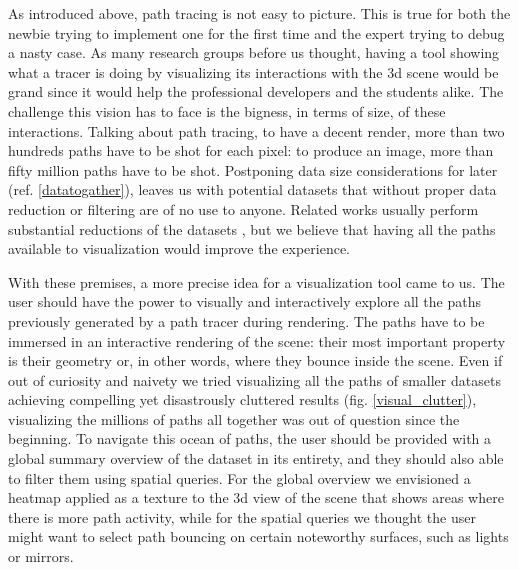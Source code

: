 As introduced above, path tracing is not easy to picture. This is true for both the newbie trying to implement one for the first time and the expert trying to debug a nasty case. As many research groups before us thought, having a tool showing what a tracer is doing by visualizing its interactions with the 3d scene would be grand since it would help the professional developers and the students alike. The challenge this vision has to face is the bigness, in terms of size, of these interactions. Talking about path tracing, to have a decent render, more than two hundreds paths have to be shot for each pixel: to produce an image, more than fifty million paths have to be shot. Postponing data size considerations for later (ref. \ref{datatogather}), leaves us with potential datasets that without proper data reduction or filtering are of no use to anyone. Related works usually perform substantial reductions of the datasets \cite{simons2019applying}\cite{EMCA@2019}, but we believe that having all the paths available to visualization would improve the experience.

With these premises, a more precise idea for a visualization tool came to us. 
The user should have the power to visually and interactively explore all the paths previously generated by a path tracer during rendering. The paths have to be immersed in an interactive rendering of the scene: their most important property is their geometry or, in other words, where they bounce inside the scene. Even if out of curiosity and naivety we tried visualizing all the paths of smaller datasets achieving compelling yet disastrously cluttered results (fig. \ref{visual_clutter}), visualizing the millions of paths all together was out of question since the beginning. To navigate this ocean of paths, the user should be provided with a global summary overview of the dataset in its entirety, and they should also able to filter them using spatial queries. For the global overview we envisioned a heatmap applied as a texture to the 3d view of the scene that shows areas where there is more path activity, while for the spatial queries we thought the user might want to select path bouncing on certain noteworthy surfaces, such as lights or mirrors. 

